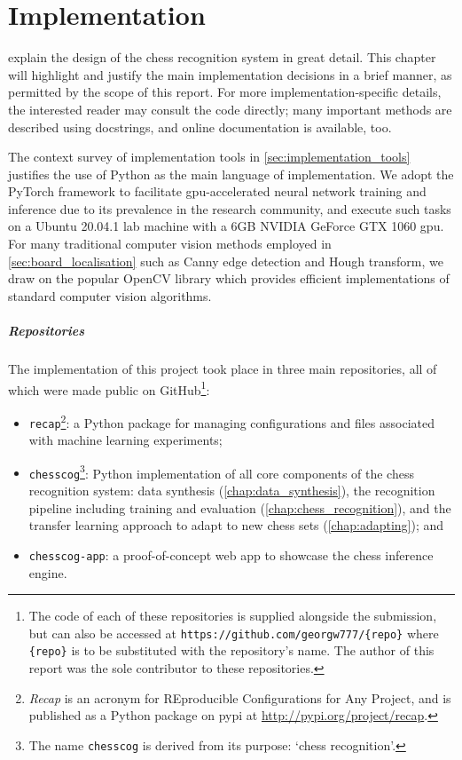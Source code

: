 \documentclass[../report.tex]{subfiles}
\begin{document}
\chapter{Implementation}
\label{chap:implementation}
 explain the design of the chess recognition system in great detail.
This chapter will highlight and justify the main implementation decisions in a brief manner, as permitted by the scope of this report.
For more implementation-specific details, the interested reader may consult the code directly; many important methods are described using docstrings, and online documentation is available, too.

The context survey of implementation tools in \cref{sec:implementation_tools} justifies the use of Python as the main language of implementation.
We adopt the PyTorch framework \cite{pytorch2019} to facilitate \acs{gpu}-accelerated neural network training and inference due to its prevalence in the research community, and execute such tasks on a Ubuntu 20.04.1 lab machine with a 6GB NVIDIA GeForce GTX 1060 \gls{gpu}.
For many traditional computer vision methods employed in \cref{sec:board_localisation} such as Canny edge detection and Hough transform, we draw on the popular OpenCV library \cite{opencv2000} which provides efficient implementations of standard computer vision algorithms.

\paragraph{Repositories}
The implementation of this project took place in three main repositories, all of which were made public on GitHub\footnote{The code of each of these repositories is supplied alongside the submission, but can also be accessed at \texttt{https://github.com/georgw777/\{repo\}} where \texttt{\{repo\}} is to be substituted with the repository's name. The author of this report was the sole contributor to these repositories.}:
\begin{itemize}
    \item \texttt{recap}\footnote{\emph{Recap} is an acronym for REproducible Configurations for Any Project, and is published as a Python package on \acs{pypi} at \url{http://pypi.org/project/recap}.}: a Python package for managing configurations and files associated with machine learning experiments;
    \item \texttt{chesscog}\footnote{The name \texttt{chesscog} is derived from its purpose: `chess recognition'.}: Python implementation of all core components of the chess recognition system: data synthesis (\cref{chap:data_synthesis}), the recognition pipeline including training and evaluation (\cref{chap:chess_recognition}), and the transfer learning approach to adapt to new chess sets (\cref{chap:adapting}); and
    \item \texttt{chesscog-app}: a proof-of-concept web app to showcase the chess inference engine.
\end{itemize}
\end{document}
